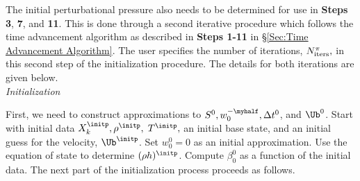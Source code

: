 The initial perturbational pressure also needs to be determined for
use in {\bf Steps 3}, {\bf 7}, and {\bf 11}. 
This is done through a second iterative procedure which follows the
time advancement algorithm as described in {\bf Steps 1-11} in 
\S \ref{Sec:Time Advancement Algorithm}.  
The user specifies the number of iterations, 
$N_{\rm iters}^{\pi},$ in this second step of the initialization procedure.
The details for both iterations are given below.\\

 {\em Initialization}

First, we need to construct approximations to $S^0, w_0^{-\myhalf}, \Delta t^0$, 
and $\Ub^0$.  Start with initial data $X_k^{\initp}, \rho^{\initp},$ $T^{\initp},$ 
an initial base state, and an initial guess for the velocity, $\Ub^{\initp}$.
Set $w_0^0 = 0$ as an initial approximation.  Use the equation of state to 
determine $(\rho h)^{\initp}$.  Compute $\beta_0^0$ as a function of 
the initial data.  The next part of the initialization process 
proceeds as follows.


